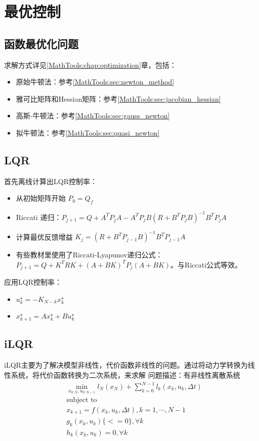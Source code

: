 \chapter{最优控制}
\section{函数最优化问题}
求解方式详见\ref{MathTools:chap:optimization}章，包括：
\begin{itemize}
    \item 原始牛顿法：参考\ref{MathTools:sec:newton_method}
    \item 雅可比矩阵和Hessian矩阵：参考\ref{MathTools:sec:jacobian_hessian}
    \item 高斯-牛顿法：参考\ref{MathTools:sec:gauss_newton}
    \item 拟牛顿法：参考\ref{MathTools:sec:quasi_newton}
\end{itemize}
\section{LQR}
\begin{theorembox}
	首先离线计算出LQR控制率：
	\begin{itemize}
		\item 从初始矩阵开始 $P_0 = Q_f$
		\item Riccati 递归：$P_{j+1} = Q + A^TP_jA - A^TP_jB(R+B^TP_jB)^{-1}B^TP_jA$
		\item 计算最优反馈增益 $K_j = (R+ B^TP_{j-1}B)^{-1}B^TP_{j-1}A$
		\item 有些教材里使用了Riccati-Lyapunov递归公式：$P_{j+1} = Q + K^TRK + (A+BK)^TP_j(A+BK)$。与Riccati公式等效。
	\end{itemize}
	应用LQR控制率：
	\begin{itemize}
		\item $u_k^\star = -K_{N-k}x_k^\star$
		\item $x_{k+1}^\star  = Ax_k^\star +Bu_k^\star$
	\end{itemize}
\end{theorembox}

\section{iLQR}
iLQR主要为了解决模型非线性，代价函数非线性的问题。通过将动力学转换为线性系统，将代价函数转换为二次系统，来求解
问题描述：有非线性离散系统
$$
\begin{aligned}
	& \min_{x_{0:N},u_{0:N-1}} l_N(x_N) + \sum^{N-1}_{k=0}l_k(x_k,u_k,\Delta t)\\
	& \text{subject to}\\
	& x_{k+1} = f(x_k,u_k,\Delta t), k = 1,\cdots,N-1 \\
	& g_k(x_k,u_k)\{<=0\},\forall k \\
	& h_k(x_k,u_k)=0,\forall k
\end{aligned}
$$

